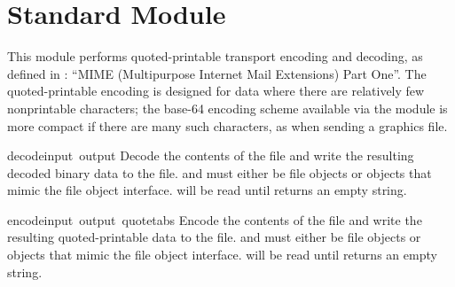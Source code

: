 \section{Standard Module }
\label{module-quopri}

This module performs quoted-printable transport encoding and decoding,
as defined in : ``MIME (Multipurpose Internet Mail Extensions)
Part One''.  The quoted-printable encoding is designed for data where
there are relatively few nonprintable characters; the base-64 encoding
scheme available via the  module is more compact if there
are many such characters, as when sending a graphics file.

\renewcommand{\indexsubitem}{(in module quopri)}

\begin{funcdesc}{decode}{input\, output}
Decode the contents of the  file and write the resulting
decoded binary data to the  file.
 and  must either be file objects or objects that
mimic the file object interface.  will be read until
 returns an empty string.
\end{funcdesc}

\begin{funcdesc}{encode}{input\, output\, quotetabs}
Encode the contents of the  file and write the resulting
quoted-printable data to the  file.
 and  must either be file objects or objects that
mimic the file object interface.  will be read until
 returns an empty string.
\end{funcdesc}



